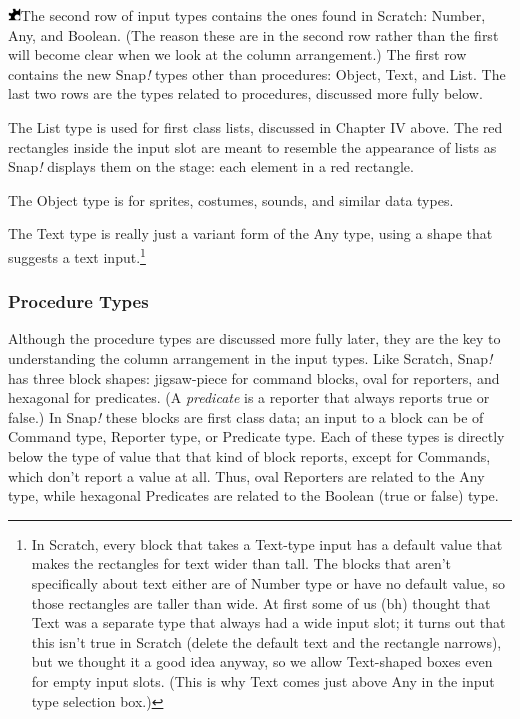 \includegraphics[width=0.13194in,height=0.13194in]{media/image658.png}The
second row of input types contains the ones found in Scratch: Number,
Any, and Boolean. (The reason these are in the second row rather than
the ﬁrst will become clear when we look at the column arrangement.) The
ﬁrst row contains the new Snap\emph{!} types other than procedures:
Object, Text, and List. The last two rows are the types related to
procedures, discussed more fully below.

The List type is used for ﬁrst class lists, discussed in Chapter IV
above. The red rectangles inside the input slot are meant to resemble
the appearance of lists as Snap\emph{!} displays them on the stage: each
element in a red rectangle.

The Object type is for sprites, costumes, sounds, and similar data
types.

The Text type is really just a variant form of the Any type, using a
shape that suggests a text input.\footnote{In Scratch, every block that
  takes a Text-type input has a default value that makes the rectangles
  for text wider than tall. The blocks that aren't specifically about
  text either are of Number type or have no default value, so those
  rectangles are taller than wide. At ﬁrst some of us (bh) thought that
  Text was a separate type that always had a wide input slot; it turns
  out that this isn't true in Scratch (delete the default text and the
  rectangle narrows), but we thought it a good idea anyway, so we allow
  Text-shaped boxes even for empty input slots. (This is why Text comes
  just above Any in the input type selection box.)}

\subsubsection{Procedure Types}\label{procedure-types}

Although the procedure types are discussed more fully later, they are
the key to understanding the column arrangement in the input types. Like
Scratch, Snap\emph{!} has three block shapes: jigsaw-piece for command
blocks, oval for reporters, and hexagonal for predicates. (A
\emph{predicate} is a reporter that always reports true or false.) In
Snap\emph{!} these blocks are ﬁrst class data; an input to a block can
be of Command type, Reporter type, or Predicate type. Each of these
types is directly below the type of value that that kind of block
reports, except for Commands, which don't report a value at all. Thus,
oval Reporters are related to the Any type, while hexagonal Predicates
are related to the Boolean (true or false) type.

